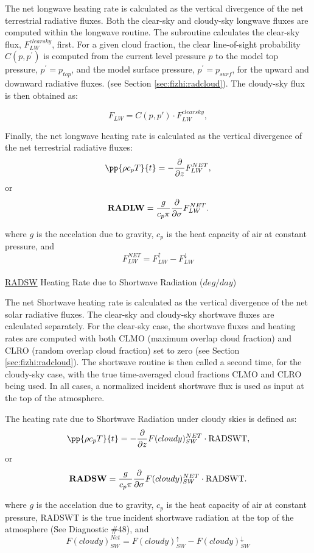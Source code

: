 \noindent
The net longwave heating rate is calculated as the vertical divergence of the
net terrestrial radiative fluxes.
Both the clear-sky and cloudy-sky longwave fluxes are computed within the
longwave routine.
The subroutine calculates the clear-sky flux, $F^{clearsky}_{LW}$, first.
For a given cloud fraction,
the clear line-of-sight probability $C(p,p^{\prime})$ is computed from the current level pressure $p$ 
to the model top pressure, $p^{\prime} = p_{top}$, and the model surface pressure, $p^{\prime} = p_{surf}$,
for the upward and downward radiative fluxes.
(see Section \ref{sec:fizhi:radcloud}).
The cloudy-sky flux is then obtained as:
   
\noindent
\[
F_{LW} = C(p,p') \cdot F^{clearsky}_{LW},
\]

\noindent
Finally, the net longwave heating rate is calculated as the vertical divergence of the
net terrestrial radiative fluxes:
\[
\pp{\rho c_p T}{t} = - {\partial \over \partial z} F_{LW}^{NET} ,
\]
or
\[
{\bf RADLW} = \frac{g}{c_p \pi} {\partial \over \partial \sigma} F_{LW}^{NET} .
\]

\noindent
where $g$ is the accelation due to gravity,
$c_p$ is the heat capacity of air at constant pressure,
and
\[
F_{LW}^{NET} = F_{LW}^\uparrow - F_{LW}^\downarrow
\]
\\


\noindent
{ \underline {RADSW} Heating Rate due to Shortwave Radiation ($deg/day$) }

\noindent
The net Shortwave heating rate is calculated as the vertical divergence of the
net solar radiative fluxes.
The clear-sky and cloudy-sky shortwave fluxes are calculated separately.
For the clear-sky case, the shortwave fluxes and heating rates are computed with
both CLMO (maximum overlap cloud fraction) and
CLRO (random overlap cloud fraction) set to zero (see Section \ref{sec:fizhi:radcloud}).
The shortwave routine is then called a second time, for the cloudy-sky case, with the
true time-averaged cloud fractions CLMO
and CLRO being used.  In all cases, a normalized incident shortwave flux is used as
input at the top of the atmosphere.

\noindent
The heating rate due to Shortwave Radiation under cloudy skies is defined as:
\[
\pp{\rho c_p T}{t} = - {\partial \over \partial z} F(cloudy)_{SW}^{NET} \cdot {\rm RADSWT},
\]
or
\[
{\bf RADSW} = \frac{g}{c_p \pi} {\partial \over \partial \sigma} F(cloudy)_{SW}^{NET}\cdot {\rm RADSWT} .
\]

\noindent
where $g$ is the accelation due to gravity,
$c_p$ is the heat capacity of air at constant pressure, RADSWT is the true incident
shortwave radiation at the top of the atmosphere (See Diagnostic \#48), and
\[
F(cloudy)_{SW}^{Net} = F(cloudy)_{SW}^\uparrow - F(cloudy)_{SW}^\downarrow
\]
\\

